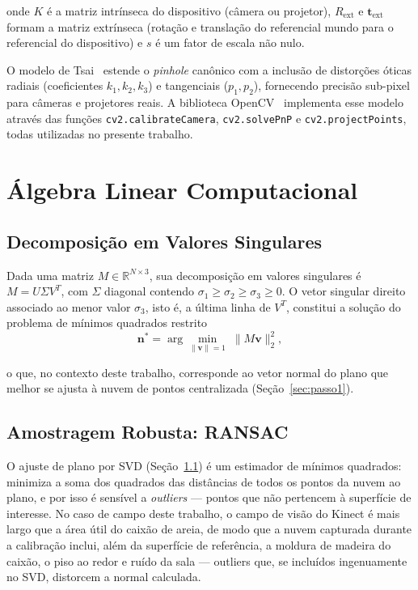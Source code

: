 \noindent onde $K$ é a matriz intrínseca do dispositivo (câmera ou
projetor), $R_{\text{ext}}$ e $\mathbf{t}_{\text{ext}}$ formam a
matriz extrínseca (rotação e translação do referencial mundo
para o referencial do dispositivo) e $s$ é um fator de escala não nulo.

O modelo de Tsai~ estende o
\textit{pinhole} canônico com a inclusão de distorções óticas
radiais (coeficientes $k_1, k_2, k_3$) e tangenciais ($p_1, p_2$),
fornecendo precisão sub-pixel para câmeras e projetores reais. A
biblioteca OpenCV~\cite{bradski2008opencv} implementa esse modelo
através das funções \texttt{cv2.calibrateCamera}, \texttt{cv2.solvePnP}
e \texttt{cv2.projectPoints}, todas utilizadas no presente trabalho.

\section{Álgebra Linear Computacional}
\label{sec:algebra}

\subsection{Decomposição em Valores Singulares}
\label{subsec:svd}

Dada uma matriz $M \in \mathbb{R}^{N \times 3}$, sua decomposição em
valores singulares é $M = U \Sigma V^{T}$, com $\Sigma$ diagonal contendo
$\sigma_1 \geq \sigma_2 \geq \sigma_3 \geq 0$. O vetor singular direito
associado ao menor valor $\sigma_3$, isto é, a última linha de $V^{T}$,
constitui a solução do problema de mínimos quadrados restrito
\begin{equation}
\label{eq:svd-min}
\mathbf{n}^* = \arg\min_{\|\mathbf{v}\| = 1} \; \|M \mathbf{v}\|_2^2,
\end{equation}

\noindent o que, no contexto deste trabalho, corresponde ao vetor normal
do plano que melhor se ajusta à nuvem de pontos centralizada
(Seção~\ref{sec:passo1}).

\subsection{Amostragem Robusta: RANSAC}
\label{subsec:ransac}

O ajuste de plano por SVD (Seção~\ref{subsec:svd}) é um estimador de
mínimos quadrados: minimiza a soma dos quadrados das distâncias
de todos os pontos da nuvem ao plano, e por isso é sensível a
\textit{outliers} — pontos que não pertencem à superfície de interesse.
No caso de campo deste trabalho, o campo de visão do Kinect é mais largo
que a área útil do caixão de areia, de modo que a nuvem capturada durante
a calibração inclui, além da superfície de referência, a moldura de
madeira do caixão, o piso ao redor e ruído da sala — outliers que, se
incluídos ingenuamente no SVD, distorcem a normal calculada.

